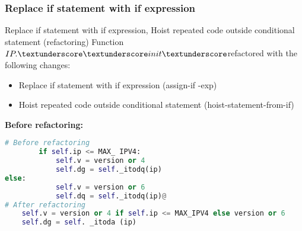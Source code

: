 \documentclass[unicode,11pt,a4paper,oneside,numbers=endperiod,openany]{scrartcl}
\begin{document}
\subsubsection{Replace if statement with if expression}
Replace if statement with if expression, Hoist repeated code outside conditional statement (refactoring)
\newline
Function $IP.\textunderscore \textunderscore init \textunderscore$refactored with the following changes:
\begin{itemize}
    \item Replace if statement with if expression (assign-if -exp)
    \item Hoist repeated code outside conditional statement (hoist-statement-from-if)
\end{itemize}
\textbf{Before refactoring:}
\begin{lstlisting}[language=Python]
# Before refactoring
        if self.ip <= MAX_ IPV4:
            self.v = version or 4
            self.dg = self._itodq(ip)
else:
            self.v = version or 6
            self.dq = self._itodq(ip)@
# After refactoring
    self.v = version or 4 if self.ip <= MAX_IPV4 else version or 6
    self.dg = self. _itoda (ip)
\end{lstlisting}
\end{document}
